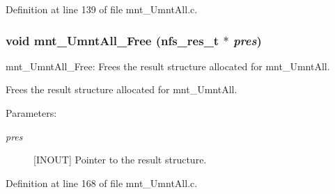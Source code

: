Definition at line 139 of file mnt\_\-UmntAll.c.
\subsubsection[{mnt\_\-UmntAll\_\-Free}]{\setlength{\rightskip}{0pt plus 5cm}void mnt\_\-UmntAll\_\-Free (nfs\_\-res\_\-t $\ast$ {\em pres})}\label{mnt__UmntAll_8c_f84eedaff38cb8d39ab0230033cd66bf}


mnt\_\-UmntAll\_\-Free: Frees the result structure allocated for mnt\_\-UmntAll.

Frees the result structure allocated for mnt\_\-UmntAll.

\begin{Desc}
\item[Parameters:]
\begin{description}
\item[{\em pres}][INOUT] Pointer to the result structure. \end{description}
\end{Desc}


Definition at line 168 of file mnt\_\-UmntAll.c.